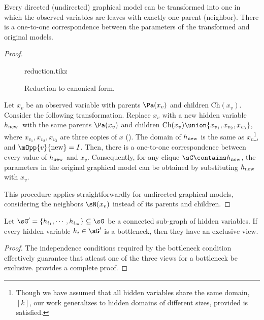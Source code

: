 \begin{lemma}
  \label{lem:reduction}
Every directed (undirected) graphical model can be transformed into one in which
  the observed variables are leaves with exactly one parent (neighbor). 
There is a one-to-one correspondence between the parameters of the
  transformed and original models.
\end{lemma}
\begin{proof}
  \begin{figure}
    \centering
    {reduction.tikz}
    \caption{Reduction to canonical form.}
    \label{fig:reduction}
  \end{figure}

  \providecommand{\hp}{\ensuremath{h_\text{\rm new}}}

  Let $x_v$ be an observed variable with parents $\Pa(x_v)$ and children $\text{Ch}(x_v)$.
  Consider the following transformation.
  Replace $x_v$ with a new hidden variable \hp\ with the same
  parents $\Pa(x_v)$ and children $\text{Ch}(x_v) \union \{x_{v_1}, x_{v_2}, x_{v_3}\}$,
  where $x_{v_1},x_{v_2},x_{v_3}$ are three copies of $x$
  (). 
  The domain of $\hp$ is the same as $x_v$\footnote{
      Though we have assumed that all hidden variables share the
      same domain, $[k]$, our work generalizes to hidden domains of
      different sizes, provided  is satisfied.
      },
    and $\mOpp{v}{\textrm{new}} = I$.
  Then, there is a one-to-one correspondence between every value of
  $\hp$ and $x_v$. Consequently, for any clique $\sC \contains \hp$, the
  parameters in the original graphical model can be obtained by
  substituting $\hp$ with $x_v$.

  This procedure applies straightforwardly for undirected graphical
  models, considering the neighbors $\sN(x_v)$ instead of its parents
  and children.
\end{proof}

\begin{lemma}
  \label{lem:bottleneck-views}  
Let $\sG' = \{ h_{i_1}, \cdots, h_{i_m} \} \subseteq \sG$ be
  a connected sub-graph of hidden variables. If every hidden variable
  $h_i \in \sG'$ is a bottleneck, then they have an exclusive view.
\end{lemma}
\begin{proof}
  The independence conditions required by the bottleneck condition
  effectively guarantee that atleast one of the three views for
  a bottleneck be exclusive. 
   provides a complete proof.
\end{proof}

